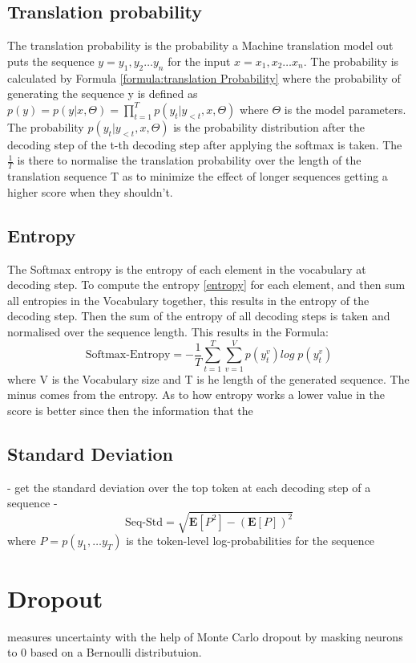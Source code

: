 \subsection{Translation probability}
The translation probability is the probability a Machine translation model out puts the sequence $y = y_1, y_2 \dots y_n$ for the input $x=x_1, x_2 \dots x_n$. The probability is calculated by Formula \ref{formula:translation Probability} where the probability of generating the sequence y is defined as $ p(y)=p(y|x,\Theta)=\prod_{t=1}^T p(y_t|y_{<t}, x, \Theta)$ where $\Theta$ is the model parameters.
The probability $p(y_t|y_{<t}, x,\Theta)$ is the probability distribution after the decoding step of the t-th decoding step after applying the softmax is taken.
The $\frac{1}{T}$ is there to normalise the translation probability over the length of the translation sequence T as to minimize the effect of longer sequences getting a higher score when they shouldn't. 


\subsection{Entropy}\label{sect:entropy}
The Softmax entropy is the entropy of each element in the vocabulary at decoding step.
To compute the entropy \ref{entropy} for each element, and then sum all entropies in the Vocabulary together, this results in the entropy of the decoding step. 
Then the sum of the entropy of all decoding steps is taken and normalised over the sequence length. 
This results in the Formula:
$$\text{Softmax-Entropy}=-\frac{1}{T}\sum_{t=1}^T\sum_{v=1}^V p(y_t^v)log\; p(y_t^v) \label{formula:translation entropy}$$ where V is the Vocabulary size and T is he length of the generated sequence. The minus comes from the entropy.
As to how entropy works a lower value in the score is better since then the information that the 

\subsection{Standard Deviation}\label{sect:stddiv}
- get the standard deviation over the top token at each decoding step of a sequence
- $$\text{Seq-Std}=\sqrt{\mathbf{E}[P^2]-(\mathbf{E}[P])^2}$$ where $P=p(y_1 , \dots y_T)$ is the token-level log-probabilities for the sequence

\section{Dropout}
measures uncertainty with the help of Monte Carlo dropout \cite{gal2016dropoutbayesianapproximationrepresenting} by masking neurons to 0 based on a Bernoulli distributuion. 


